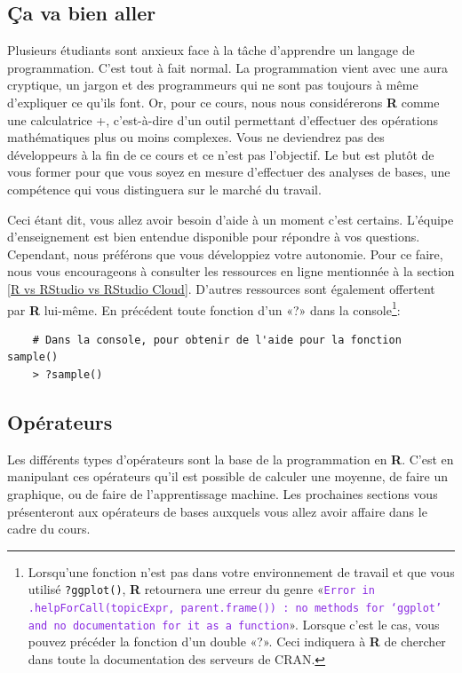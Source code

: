 \documentclass[10.5pt,a4paper]{article}
\begin{document}
  \subsection{Ça va bien aller}
  Plusieurs étudiants sont anxieux face à la tâche d'apprendre un langage de programmation. C'est tout à fait normal. La programmation vient avec une aura cryptique, un jargon et des programmeurs qui ne sont pas toujours à même d'expliquer ce qu'ils font. Or, pour ce cours, nous nous considérerons \textbf{R} comme une calculatrice +, c'est-à-dire d'un outil permettant d'effectuer des opérations mathématiques plus ou moins complexes. Vous ne deviendrez pas des développeurs à la fin de ce cours et ce n'est pas l'objectif. Le but est plutôt de vous former pour que vous soyez en mesure d'effectuer des analyses de bases, une compétence qui vous distinguera sur le marché du travail.

Ceci étant dit, vous allez avoir besoin d'aide à un moment c'est certains. L'équipe d'enseignement est bien entendue disponible pour répondre à vos questions. Cependant, nous préférons que vous développiez votre autonomie. Pour ce faire, nous vous encourageons à consulter les ressources en ligne mentionnée à la section \ref{R vs RStudio vs RStudio Cloud}. D'autres ressources sont également offertent par \textbf{R} lui-même. En précédent toute fonction d'un «?» dans la console\footnote{Lorsqu'une fonction n'est pas dans votre environnement de travail et que vous utilisé \texttt{?ggplot()}, \textbf{R} retournera une erreur du genre «\textcolor{BlueViolet}{\texttt{Error in .helpForCall(topicExpr, parent.frame()) : no methods for ‘ggplot’ and no documentation for it as a function}}». Lorsque c'est le cas, vous pouvez précéder la fonction d'un double «?». Ceci indiquera à \textbf{R} de chercher dans toute la documentation des serveurs de CRAN.}:

  \begin{lstlisting}
    # Dans la console, pour obtenir de l'aide pour la fonction sample()
    > ?sample()
  \end{lstlisting}
  
  \subsection{Opérateurs}
  Les différents types d'opérateurs sont la base de la programmation en \textbf{R}. C'est en manipulant ces opérateurs qu'il est possible de calculer une moyenne, de faire un graphique, ou de faire de l'apprentissage machine. Les prochaines sections vous présenteront aux opérateurs de bases auxquels vous allez avoir affaire dans le cadre du cours. 
  
\end{document}
